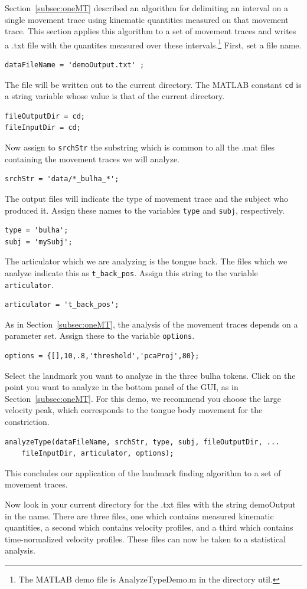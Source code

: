 \documentclass[a4paper, 12pt]{article}
\begin{document}
Section~\ref{subsec:oneMT} described an algorithm for delimiting an interval on a single movement trace using kinematic quantities measured on that movement trace. This section applies this algorithm to a set of movement traces and writes a .txt file with the quantites measured over these intervals.\footnote{The MATLAB demo file is AnalyzeTypeDemo.m in the directory util.} First, set a file name. 
\begin{verbatim}
dataFileName = 'demoOutput.txt' ;
\end{verbatim}
The file will be written out to the current directory. The MATLAB constant \texttt{cd} is a string variable whose value is that of the current directory. 
\begin{verbatim}
fileOutputDir = cd;
fileInputDir = cd;
\end{verbatim}
Now assign to \texttt{srchStr} the substring which is common to all the .mat files containing the movement traces we will analyze.
\begin{verbatim}
srchStr = 'data/*_bulha_*';
\end{verbatim}
The output files will indicate the type of movement trace and the subject who produced it. Assign these names to the variables \texttt{type} and \texttt{subj}, respectively.
\begin{verbatim}
type = 'bulha';
subj = 'mySubj';
\end{verbatim}
The articulator which we are analyzing is the tongue back. The files which we analyze indicate this as \texttt{t\_back\_pos}. Assign this string to the variable \texttt{articulator}.
\begin{verbatim}
articulator = 't_back_pos';
\end{verbatim}
As in Section~\ref{subsec:oneMT}, the analysis of the movement traces depends on a parameter set. Assign these to the variable \texttt{options}.
\begin{verbatim}
options = {[],10,.8,'threshold','pcaProj',80};
\end{verbatim}
Select the landmark you want to analyze in the three bulha tokens. Click on the point you want to analyze in the bottom panel of the GUI, as in Section~\ref{subsec:oneMT}. For this demo, we recommend you choose the large velocity peak, which corresponds to the tongue body movement for the  constriction.
\begin{verbatim}
analyzeType(dataFileName, srchStr, type, subj, fileOutputDir, ...
    fileInputDir, articulator, options);
\end{verbatim}
This concludes our application of the landmark finding algorithm to a set of movement traces.

Now look in your current directory for the .txt files with the string demoOutput in the name. There are three files, one which contains measured kinematic quantities, a second which contains velocity profiles, and a third which contains time-normalized velocity profiles. These files can now be taken to a statistical analysis.
 
\clearpage
\thispagestyle{empty}


\nocite{*}
\end{document}
